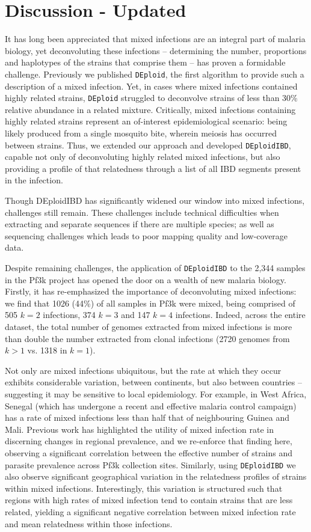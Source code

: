 \documentclass[9pt,lineno]{elife}
\begin{document}
\section{Discussion - Updated}

It has long been appreciated that mixed infections are an integral part of malaria biology, yet deconvoluting these infections -- determining the number, proportions and haplotypes of the strains that comprise them -- has proven a formidable challenge.  Previously we published \texttt{DEploid}, the first algorithm to provide such a description of a mixed infection. Yet, in cases where mixed infections contained highly related strains, \texttt{DEploid} struggled to deconvolve strains of less than 30\%
relative abundance in a related mixture. Critically, mixed infections containing highly related strains represent an of-interest epidemiological scenario: being likely produced from a single mosquito bite, wherein meiosis has occurred between strains. Thus, we extended our approach and developed \texttt{DEploidIBD}, capable not only of deconvoluting highly related mixed infections, but also providing a profile of that relatedness through a list of all IBD segments present in the infection.

Though DEploidIBD has significantly widened our window into mixed infections, challenges still remain. These challenges include technical difficulties when extracting and separate sequences if there are multiple species; as well as sequencing challenges which leads to poor mapping quality and low-coverage data.

Despite remaining challenges, the application of \texttt{DEploidIBD} to the 2,344 samples in the Pf3k project has opened the door on a wealth of new malaria biology. Firstly, it has re-emphasized the importance of deconvoluting mixed infections: we find that 1026 (44\%) of all samples in Pf3k were mixed, being comprised of 505 $k=2$ infections, 374 $k=3$ and 147 $k=4$ infections. Indeed, across the entire dataset, the total number of genomes extracted from mixed infections is more than double the number extracted from clonal infections (2720 genomes from $k>1$ vs. 1318 in $k=1$).

Not only are mixed infections ubiquitous, but the rate at which they occur exhibits considerable variation, between continents, but also between countries -- suggesting it may be sensitive to local epidemiology.  For example, in West Africa, Senegal (which has undergone a recent and effective malaria control campaign) has a rate of mixed infections less than half that of neighbouring Guinea and Mali.  Previous work has highlighted the utility of mixed infection rate in discerning changes in regional prevalence, and we re-enforce that finding here, observing a significant correlation between the effective number of strains and parasite prevalence across Pf3k collection sites. Similarly, using \texttt{DEploidIBD} we also observe significant geographical variation in the relatedness profiles of strains within mixed infections.  Interestingly, this variation is structured such that regions with high rates of mixed infection tend to contain strains that are less related, yielding a significant negative correlation between mixed infection rate and mean relatedness within those infections.
\end{document}
